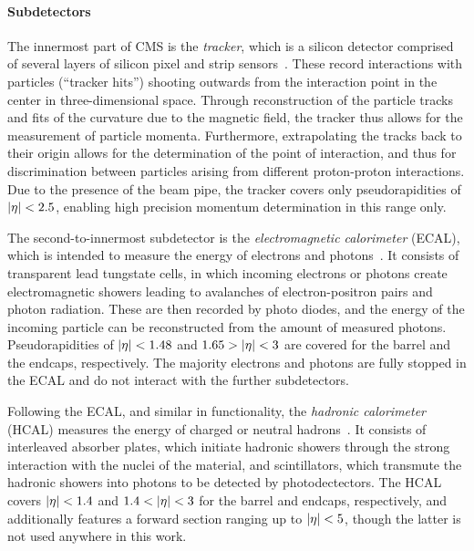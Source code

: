 \paragraph{Subdetectors}
The innermost part of CMS is the \textit{tracker}, which is a silicon detector comprised of several layers of silicon pixel and strip sensors~\cite{CMS:2014pgm,CMSTrackerGroup:2020edz}. These record interactions with particles (``tracker hits'') shooting outwards from the interaction point in the center in three-dimensional space. Through reconstruction of the particle tracks and fits of the curvature due to the magnetic field, the tracker thus allows for the measurement of particle momenta. Furthermore, extrapolating the tracks back to their origin allows for the determination of the point of interaction, and thus for discrimination between particles arising from different proton-proton interactions. Due to the presence of the beam pipe, the tracker covers only pseudorapidities of $|\eta| < 2.5$, enabling high precision momentum determination in this range only.

The second-to-innermost subdetector is the \textit{electromagnetic calorimeter} (ECAL), which is intended to measure the energy of electrons and photons~\cite{CMS:1997ysd,CMS:EGM-17-001}. It consists of transparent lead tungstate cells, in which incoming electrons or photons create electromagnetic showers leading to avalanches of electron-positron pairs and photon radiation. These are then recorded by photo diodes, and the energy of the incoming particle can be reconstructed from the amount of measured photons. Pseudorapidities of $|\eta| < 1.48$ and $1.65 > |\eta| < 3$ are covered for the barrel and the endcaps, respectively. The majority electrons and photons are fully stopped in the ECAL and do not interact with the further subdetectors.

Following the ECAL, and similar in functionality, the \textit{hadronic calorimeter} (HCAL) measures the energy of charged or neutral hadrons~\cite{CMS:1997xji,CMS:2012tda}. It consists of interleaved absorber plates, which initiate hadronic showers through the strong interaction with the nuclei of the material, and scintillators, which transmute the hadronic showers into photons to be detected by photodectectors. The HCAL covers $|\eta| < 1.4$ and $1.4 < |\eta| < 3$ for the barrel and endcaps, respectively, and additionally features a forward section ranging up to $|\eta| < 5$, though the latter is not used anywhere in this work.


